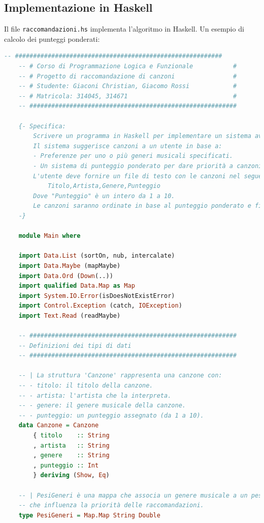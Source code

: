 \documentclass[a4paper,11pt]{article}
\begin{document}
\subsection{Implementazione in Haskell}
Il file \texttt{raccomandazioni.hs} implementa l'algoritmo in Haskell. Un esempio di calcolo dei punteggi ponderati:
\begin{lstlisting}[language=Haskell]
    -- #########################################################
    -- # Corso di Programmazione Logica e Funzionale           #
    -- # Progetto di raccomandazione di canzoni                #
    -- # Studente: Giaconi Christian, Giacomo Rossi            #
    -- # Matricola: 314045, 314671                             #
    -- #########################################################
    
    {- Specifica:
        Scrivere un programma in Haskell per implementare un sistema avanzato di raccomandazione di canzoni.
        Il sistema suggerisce canzoni a un utente in base a:
        - Preferenze per uno o più generi musicali specificati.
        - Un sistema di punteggio ponderato per dare priorità a canzoni più rilevanti.
        L'utente deve fornire un file di testo con le canzoni nel seguente formato:
            Titolo,Artista,Genere,Punteggio
        Dove "Punteggio" è un intero da 1 a 10.
        Le canzoni saranno ordinate in base al punteggio ponderato e filtrate per genere.
    -}
    
    module Main where
    
    import Data.List (sortOn, nub, intercalate)
    import Data.Maybe (mapMaybe)
    import Data.Ord (Down(..))
    import qualified Data.Map as Map
    import System.IO.Error(isDoesNotExistError)
    import Control.Exception (catch, IOException)
    import Text.Read (readMaybe)
    
    -- #########################################################
    -- Definizioni dei tipi di dati
    -- #########################################################
    
    -- | La struttura 'Canzone' rappresenta una canzone con:
    -- - titolo: il titolo della canzone.
    -- - artista: l'artista che la interpreta.
    -- - genere: il genere musicale della canzone.
    -- - punteggio: un punteggio assegnato (da 1 a 10).
    data Canzone = Canzone
        { titolo    :: String
        , artista   :: String
        , genere    :: String
        , punteggio :: Int
        } deriving (Show, Eq)
    
    -- | PesiGeneri è una mappa che associa un genere musicale a un peso
    -- che influenza la priorità delle raccomandazioni.
    type PesiGeneri = Map.Map String Double
    

\end{lstlisting}
\end{document}
